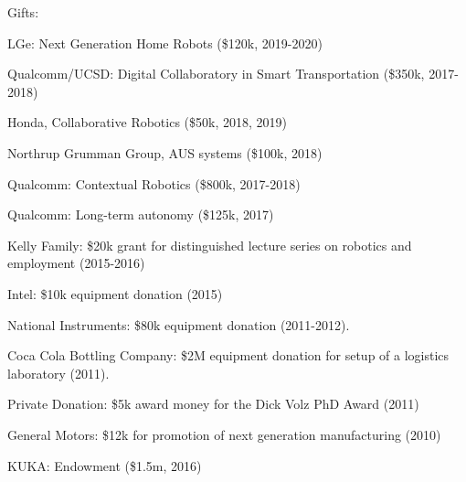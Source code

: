\documentclass{article}
\begin{document}
\begin{cv}
\begin{cvlist}{Gifts:}
\item LGe: Next Generation Home Robots (\$120k, 2019-2020)
\item Qualcomm/UCSD: Digital Collaboratory in Smart Transportation
  (\$350k, 2017-2018)
\item Honda, Collaborative Robotics (\$50k, 2018, 2019)
\item Northrup Grumman Group, AUS systems (\$100k, 2018)
\item Qualcomm: Contextual Robotics (\$800k, 2017-2018)
\item Qualcomm: Long-term autonomy (\$125k, 2017)
\item Kelly Family: \$20k grant for distinguished lecture series on
  robotics and employment (2015-2016)
\item Intel: \$10k equipment donation (2015)
\item National Instruments: \$80k equipment donation (2011-2012).
\item Coca Cola Bottling Company: \$2M equipment donation for setup of
  a logistics laboratory (2011).
\item Private Donation: \$5k award money for the Dick Volz PhD Award
  (2011)
\item General Motors: \$12k for promotion of next generation
  manufacturing (2010)
\item KUKA: Endowment (\$1.5m, 2016)
\end{cvlist}


\end{cv}
\end{document}
